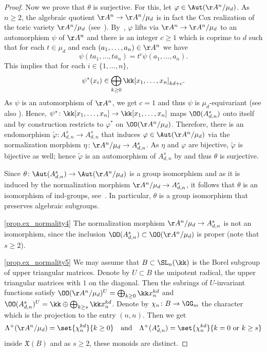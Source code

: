 \begin{proof}
Now we prove that $\theta$ is surjective. For this, let $\varphi \in \Aut(\AA^n / \mu_d)$.
As $n \geq 2$,
the algebraic quotient $\AA^n \to \AA^n/\mu_d$ is in fact the Cox realization of the toric variety
$\AA^n/\mu_d$ (see~\cite[Th.\,3.1]{ArGa2010Cox-rings-semigrou}).
By~\cite[Cor.\,2.5, Lem.\,4.2]{Be2003Lifting-of-morphis},
$\varphi$ lifts via $\AA^n \to \AA^n / \mu_d$ to an automorphism $\psi$ of $\AA^n$
and there is an integer $c \geq 1$ which is coprime to $d$ such that for each $t \in \mu_d$
and each $(a_1, \ldots, a_n) \in \AA^n$ we have
\[
\psi(t a_1, \ldots, t a_n) = t^c \psi(a_1, \ldots, a_n).
\]
This implies that for each $i \in \{1, \ldots, n\}$,
\[
\psi^\ast(x_i) \in \bigoplus_{k\geq0} \kk[x_1,\dots,x_n]_{kd+c}.
\]
As $\psi$ is an automorphism of $\AA^n$, we get $c = 1$ and thus
$\psi$ is $\mu_d$-equivariant (see also \cite[Prop.\,4]{Re2017Characterization-o}).
Hence, $\psi^\ast \colon \kk[x_1, \ldots,x_n] \to \kk[x_1, \ldots, x_n]$ maps
$\OO(A_{d, n}^s)$ onto itself and by construction restricts to $\varphi^\ast$ on $\OO(\AA^n / \mu_d)$.
Therefore, there is an endomorphism $\tilde{\varphi} \colon A_{d, n}^s \to A_{d, n}^s$
that induces $\varphi \in \Aut(\AA^n / \mu_d)$
via the normalization morphism $\eta \colon \AA^n / \mu_d \to A_{d, n}^s$.
As $\eta$ and $\varphi$ are bijective,
$\tilde{\varphi}$ is bijective as well;
hence $\tilde{\varphi}$ is an automorphism of $A_{d, n}^s$ by \cite[Lem.\,1]{Ka2005On-a-theorem-of-Ax} and thus $\theta$ is surjective.

Since $\theta \colon \Aut(A_{d, n}^s) \to \Aut(\AA^n / \mu_d)$ is a group isomorphism
and as it is induced by the normalization morphism $\AA^n / \mu_d \to A_{d, n}^s$, it follows that $\theta$
is an isomorphism of ind-groups, see~\cite[Prop.\,12.1.1]{FuKr2018On-the-geometry-of}. In particular, $\theta$ is a group isomorphism that
preserves algebraic subgroups.

\eqref{prop.ex_normality4}
The normalization morphism $\AA^n / \mu_d \to A_{d, n}^s$ is
not an isomorphism, since the inclusion $\OO(A_{d, n}^s) \subset \OO(\AA^n / \mu_d)$ is proper
(note that $s \geq 2$).

\eqref{prop.ex_normality5}
We may assume that $B \subset \SL_n(\kk)$ is the Borel subgroup of upper triangular matrices.
Denote by $U \subset B$ the unipotent radical, \ie the upper triangular matrices with $1$ on the diagonal.
Then the subrings of $U$-invariant functions satisfy
$\OO(\AA^n / \mu_d)^U = \bigoplus_{k \geq 0} \kk x_n^{kd}$ and
$\OO(A_{d, n}^s)^U = \kk \oplus \bigoplus_{k \geq s} \kk x_n^{kd}$. Denote by
$\chi_n \colon B \to \GG_m$ the character which is the projection to the entry $(n, n)$.
Then we get
\[
\Lambda^+(\AA^n / \mu_d) = \set{\chi_n^{kd}}{k \geq 0} \quad \textrm{and} \quad
\Lambda^+(A_{d, n}^s) = \set{\chi_n^{kd}}{k = 0 \ \textrm{or} \ k \geq s}
\]
inside $\mathfrak{X}(B)$ and as $s \geq 2$, these monoids are distinct.
\end{proof}

